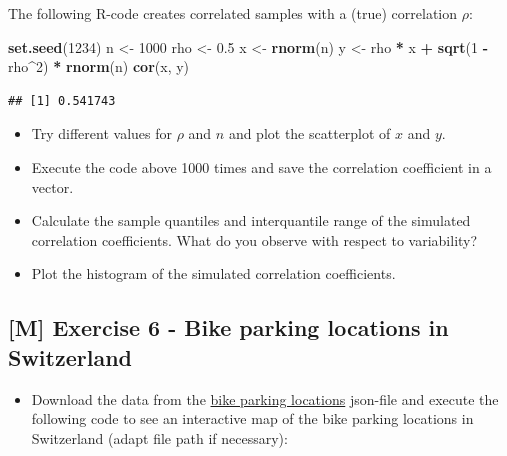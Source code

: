 \documentclass[
]{book}
\newenvironment{Shaded}{\begin{snugshade}}{\end{snugshade}}
\newcommand{\DecValTok}[1]{\textcolor[rgb]{0.00,0.00,0.81}{#1}}
\newcommand{\FloatTok}[1]{\textcolor[rgb]{0.00,0.00,0.81}{#1}}
\newcommand{\FunctionTok}[1]{\textcolor[rgb]{0.13,0.29,0.53}{\textbf{#1}}}
\newcommand{\NormalTok}[1]{#1}
\newcommand{\OtherTok}[1]{\textcolor[rgb]{0.56,0.35,0.01}{#1}}
\newcommand{\SpecialCharTok}[1]{\textcolor[rgb]{0.81,0.36,0.00}{\textbf{#1}}}
\providecommand{\tightlist}{%
  \setlength{\itemsep}{0pt}\setlength{\parskip}{0pt}}
\begin{document}
The following R-code creates correlated samples with a (true) correlation \(\rho\):

\begin{Shaded}
\begin{Highlighting}[]
\FunctionTok{set.seed}\NormalTok{(}\DecValTok{1234}\NormalTok{)}
\NormalTok{n }\OtherTok{\textless{}{-}} \DecValTok{1000}
\NormalTok{rho }\OtherTok{\textless{}{-}} \FloatTok{0.5}
\NormalTok{x }\OtherTok{\textless{}{-}} \FunctionTok{rnorm}\NormalTok{(n)}
\NormalTok{y }\OtherTok{\textless{}{-}}\NormalTok{ rho }\SpecialCharTok{*}\NormalTok{ x }\SpecialCharTok{+} \FunctionTok{sqrt}\NormalTok{(}\DecValTok{1} \SpecialCharTok{{-}}\NormalTok{ rho}\SpecialCharTok{\^{}}\DecValTok{2}\NormalTok{) }\SpecialCharTok{*} \FunctionTok{rnorm}\NormalTok{(n)}
\FunctionTok{cor}\NormalTok{(x, y)}
\end{Highlighting}
\end{Shaded}

\begin{verbatim}
## [1] 0.541743
\end{verbatim}

\begin{itemize}
\tightlist
\item
  Try different values for \(\rho\) and \(n\) and plot the scatterplot of \(x\) and \(y\).
\item
  Execute the code above 1000 times and save the correlation coefficient in a vector.
\item
  Calculate the sample quantiles and interquantile range of the simulated correlation coefficients.
  What do you observe with respect to variability?
\item
  Plot the histogram of the simulated correlation coefficients.
\end{itemize}

\subsection{{[}M{]} Exercise 6 - Bike parking locations in Switzerland}\label{m-exercise-6---bike-parking-locations-in-switzerland}

\begin{itemize}
\tightlist
\item
  Download the data from the
  \href{https://opentransportdata.swiss/en/dataset/bike-parking}{bike parking locations} json-file
  and execute the following code to see an interactive map of the bike parking locations in
  Switzerland (adapt file path if necessary):
\end{itemize}
\end{document}

